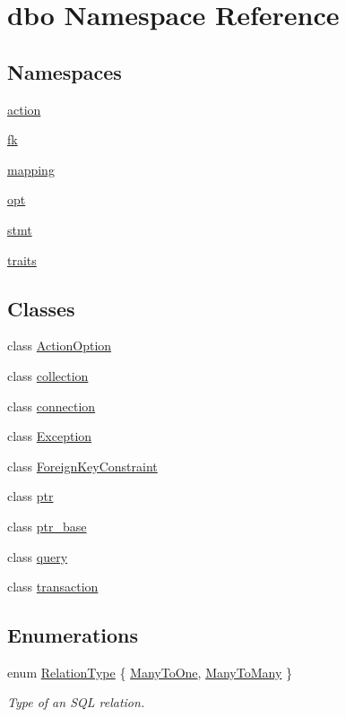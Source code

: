 \hypertarget{namespacedbo}{\section{dbo Namespace Reference}
\label{namespacedbo}
}
\subsection*{Namespaces}
\begin{DoxyCompactItemize}
\item 
 \hyperlink{namespacedbo_1_1action}{action}
\item 
 \hyperlink{namespacedbo_1_1fk}{fk}
\item 
 \hyperlink{namespacedbo_1_1mapping}{mapping}
\item 
 \hyperlink{namespacedbo_1_1opt}{opt}
\item 
 \hyperlink{namespacedbo_1_1stmt}{stmt}
\item 
 \hyperlink{namespacedbo_1_1traits}{traits}
\end{DoxyCompactItemize}
\subsection*{Classes}
\begin{DoxyCompactItemize}
\item 
class \hyperlink{classdbo_1_1_action_option}{Action\+Option}
\item 
class \hyperlink{classdbo_1_1collection}{collection}
\item 
class \hyperlink{classdbo_1_1connection}{connection}
\item 
class \hyperlink{classdbo_1_1_exception}{Exception}
\item 
class \hyperlink{classdbo_1_1_foreign_key_constraint}{Foreign\+Key\+Constraint}
\item 
class \hyperlink{classdbo_1_1ptr}{ptr}
\item 
class \hyperlink{classdbo_1_1ptr__base}{ptr\+\_\+base}
\item 
class \hyperlink{classdbo_1_1query}{query}
\item 
class \hyperlink{classdbo_1_1transaction}{transaction}
\end{DoxyCompactItemize}
\subsection*{Enumerations}
\begin{DoxyCompactItemize}
\item 
enum \hyperlink{namespacedbo_ab7f92e64aea13b1e3b60021e72a9fc73}{Relation\+Type} \{ \hyperlink{namespacedbo_ab7f92e64aea13b1e3b60021e72a9fc73a59e6c8daa6834e97b78412862dd15d2c}{Many\+To\+One}, 
\hyperlink{namespacedbo_ab7f92e64aea13b1e3b60021e72a9fc73a1ace46567253a79a9b365e767e674a8f}{Many\+To\+Many}
 \}
\begin{DoxyCompactList}\small\item\em Type of an S\+Q\+L relation. \end{DoxyCompactList}\end{DoxyCompactItemize}
